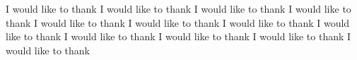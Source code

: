 
I would like to thank I would like to thank I would like to thank I would like to thank I would like to thank I would like to thank I would like to thank I would like to thank I would like to thank I would like to thank I would like to thank I would like to thank 
